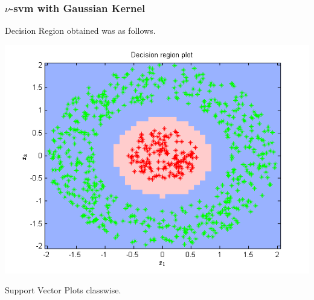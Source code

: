 \documentclass{article}
\begin{document}
\newpage

\subsubsection{$\nu$-svm with Gaussian Kernel}
Decision Region obtained was as follows.
\begin{center}
\includegraphics[scale=1]{Classification/1b/nu_g/dec}
\end{center}
Support Vector Plots classwise.
\end{document}
